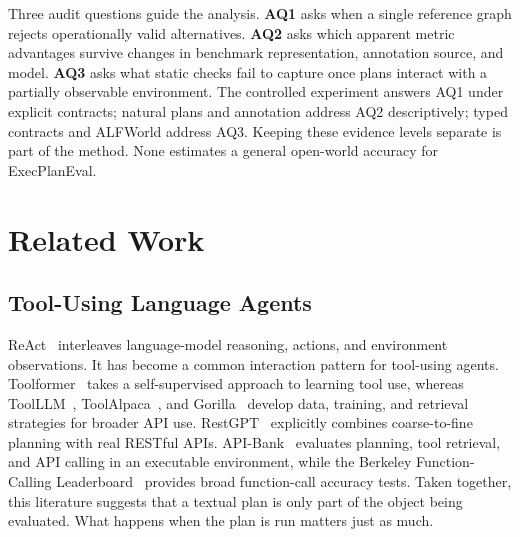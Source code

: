 \documentclass[10pt]{article}
\begin{document}
Three audit questions guide the analysis. \textbf{AQ1} asks when a single
reference graph rejects operationally valid alternatives. \textbf{AQ2} asks
which apparent metric advantages survive changes in benchmark representation,
annotation source, and model. \textbf{AQ3} asks what static checks fail to
capture once plans interact with a partially observable environment. The
controlled experiment answers AQ1 under explicit contracts; natural plans and
annotation address AQ2 descriptively; typed contracts and ALFWorld address AQ3.
Keeping these evidence levels separate is part of the method. None estimates a
general open-world accuracy for ExecPlanEval.

\section{Related Work}
\subsection{Tool-Using Language Agents}
ReAct~\cite{yao2023react} interleaves language-model reasoning, actions, and
environment observations. It has become a common interaction pattern for
tool-using agents. Toolformer~\cite{schick2023toolformer} takes a
self-supervised approach to learning tool use, whereas ToolLLM~\cite{qin2023toolllm},
ToolAlpaca~\cite{tang2023toolalpaca}, and Gorilla~\cite{patil2023gorilla}
develop data, training, and retrieval strategies for broader API use.
RestGPT~\cite{song2023restgpt} explicitly combines coarse-to-fine planning with
real RESTful APIs. API-Bank~\cite{li2023apibank} evaluates planning, tool
retrieval, and API calling in an executable environment, while the Berkeley
Function-Calling Leaderboard~\cite{yan2024bfcl} provides broad function-call
accuracy tests. Taken together, this literature suggests that a textual plan
is only part of the object being evaluated. What happens when the plan is run
matters just as much.
\end{document}
